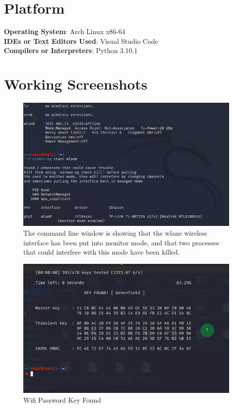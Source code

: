 \documentclass[11pt]{article}
\begin{document}
\section{Platform}
\textbf{Operating System}: Arch Linux x86-64 \\
\textbf{IDEs or Text Editors Used}: Visual Studio Code\\
\textbf{Compilers or Interpreters}: Python 3.10.1\\

\section{Working Screenshots}

\begin{figure}[H]
	\centering
	\includegraphics[width=.95\textwidth]{01.png}
	\caption{The command line window is showing that the wlane wireless interface has been put into monitor mode, and that two processes that could interfere with this mode have been killed.}
\end{figure}

\begin{figure}[H]
	\centering
	\includegraphics[width=.95\textwidth]{02.png}
	\caption{Wifi Password Key Found}
\end{figure}
\end{document}
